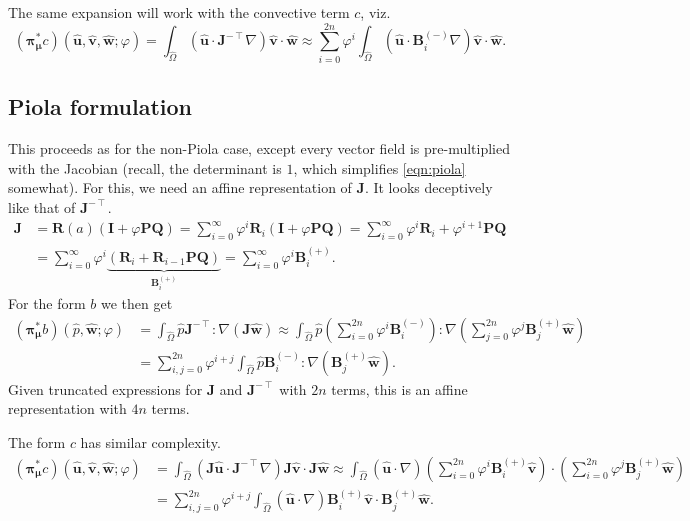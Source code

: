 \documentclass[onecolumn, twoside, a4paper, 11pt]{article}
\begin{document}
The same expansion will work with the convective term $c$, viz.
\begin{equation}
  ({\bm\pi}^*_{\bm\mu}c)(
    \hat{\bm u},
    \hat{\bm v},
    \hat{\bm w};
    \varphi
  )
  = \int_{\hat{\Omega}} (\hat{\bm u} \cdot \bm J^{-\intercal}\nabla) \hat{\bm v} \cdot \hat{\bm w}
  \approx \sum_{i=0}^{2n} \varphi^i \int_{\hat{\Omega}}
    (\hat{\bm u} \cdot \bm B^{(-)}_i \nabla) \hat{\bm v} \cdot \hat{\bm w}.
\end{equation}

\subsection{Piola formulation}

This proceeds as for the non-Piola case, except every vector field is
pre-multiplied with the Jacobian (recall, the determinant is $1$, which
simplifies \eqref{eqn:piola} somewhat). For this, we need an affine
representation of $\bm J$. It looks deceptively like that of $\bm
J^{-\intercal}$.
\begin{align}
  \nonumber
  \bm J
  &= \bm R(a) (\bm I + \varphi \bm P \bm Q)
  = \sum_{i=0}^\infty \varphi^i \bm R_i (\bm I + \varphi \bm P \bm Q)
  = \sum_{i=0}^\infty \varphi^i \bm R_i + \varphi^{i+1} \bm P \bm Q \\
  &= \sum_{i=0}^\infty
    \varphi^i \underbrace{\left(
    \bm R_i + \bm R_{i-1} \bm P \bm Q
    \right)}_{\bm B^{(+)}_i} = \sum_{i=0}^\infty \varphi^i \bm B^{(+)}_i.
\end{align}
For the form $b$ we then get
\begin{align}
  \nonumber
  ({\bm\pi}^*_{\bm\mu}b)(
    \hat{p},
    \hat{\bm w};
    \varphi
  ) &= \int_{\hat{\Omega}} \hat{p} \bm J^{-\intercal} : \nabla (\bm J \hat{\bm w})
    \approx \int_{\hat{\Omega}} \hat{p}
      \left( \sum_{i=0}^{2n} \varphi^i \bm B^{(-)}_i \right) : \nabla
      \left( \sum_{j=0}^{2n} \varphi^j \bm B^{(+)}_j \hat{\bm w} \right) \\
    &= \sum_{i,j=0}^{2n} \varphi^{i+j}
      \int_{\hat{\Omega}} \hat{p} \bm B^{(-)}_i :
      \nabla \left( \bm B^{(+)}_j \hat{\bm w} \right).
\end{align}
Given truncated expressions for $\bm J$ and $\bm J^{-\intercal}$ with $2n$
terms, this is an affine representation with $4n$ terms.

The form $c$ has similar complexity.
\begin{align}
  \nonumber
  ({\bm\pi}^*_{\bm\mu}c)(
    \hat{\bm u},
    \hat{\bm v},
    \hat{\bm w};
    \varphi
  )
  &= \int_{\hat{\Omega}} (\bm J \hat{\bm u} \cdot \bm J^{-\intercal}\nabla)
    \bm J \hat{\bm v} \cdot \bm J \hat{\bm w}
  \approx \int_{\hat{\Omega}} (\hat{\bm u} \cdot \nabla)
      \left( \sum_{i=0}^{2n} \varphi^i \bm B^{(+)}_i \hat{\bm v} \right) \cdot
    \left( \sum_{i=0}^{2n} \varphi^j \bm B^{(+)}_j \hat{\bm w} \right) \\
  &= \sum_{i,j=0}^{2n} \varphi^{i+j}
    \int_{\hat{\Omega}} (\hat{\bm u} \cdot \nabla) \bm B^{(+)}_i \hat{\bm v} \cdot \bm B^{(+)}_j \hat{\bm w}.
\end{align}
\end{document}
